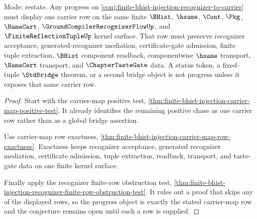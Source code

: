 \begin{theorem}
\label{thm:finite-bhist-injection-carrier-map-progress-row}
Mode: restate. Any progress on \autoref{conj:finite-bhist-injection-recognizer-to-carrier} must display one carrier row on the same finite $\BHist$, $\hsame$, $\Cont$, $\Pkg$, $\NameCert$, $\GroundCompilerRecognizerFlowUp$, and $\FiniteReflectionTupleUp$ kernel surface. That row must preserve recognizer acceptance, generated-recognizer mediation, certificate-gate admission, finite tuple extraction, $\BHist$ component readback, componentwise $\hsame$ transport, $\NameCert$ transport, and $\ChapterTasteGate$ data. A status token, a fixed-tuple $\StdBridge$ theorem, or a second bridge object is not progress unless it exposes that same carrier row.
\end{theorem}
\begin{proof}
Start with the carrier-map positive test, \autoref{thm:finite-bhist-injection-carrier-map-positive-test}. It already identifies the remaining positive chase as one carrier row rather than as a global bridge assertion.

Use carrier-map row exactness, \autoref{thm:finite-bhist-injection-carrier-map-row-exactness}. Exactness keeps recognizer acceptance, generated recognizer mediation, certificate admission, tuple extraction, readback, transport, and taste-gate data on one finite kernel surface.

Finally apply the recognizer finite-row obstruction test, \autoref{thm:finite-bhist-injection-recognizer-finite-row-obstruction-test}. It rules out a proof that skips any of the displayed rows, so the progress object is exactly the stated carrier-map row and the conjecture remains open until such a row is supplied.
\end{proof}

